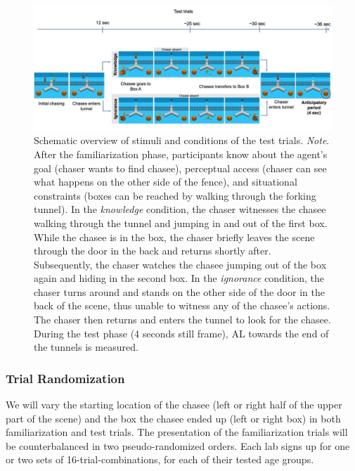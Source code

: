 \documentclass[
  english,
  man,floatsintext]{apa6}
\begin{document}
\begin{figure}

{\centering \includegraphics[width=6.5in]{Figure2} 

}

\caption{Schematic overview of stimuli and conditions of the test trials. \newline{} \textit{Note}. After the familiarization phase, participants know about the agent’s goal (chaser wants to find chasee), perceptual access (chaser can see what happens on the other side of the fence), and situational constraints (boxes can be reached by walking through the forking tunnel). In the \textit{knowledge} condition, the chaser witnesses the chasee walking through the tunnel and jumping in and out of the first box. While the chasee is in the box, the chaser briefly leaves the scene through the door in the back and returns shortly after. Subsequently, the chaser watches the chasee jumping out of the box again and hiding in the second box. In the \textit{ignorance} condition, the chaser turns around and stands on the other side of the door in the back of the scene, thus unable to witness any of the chasee’s actions. The chaser then returns and enters the tunnel to look for the chasee. During the test phase (4 seconds still frame), AL towards the end of the tunnels is measured.}\label{fig:fig2}
\end{figure}

\hypertarget{trial-randomization}{%
\subsubsection{Trial Randomization}\label{trial-randomization}}

We will vary the starting location of the chasee (left or right half of the upper part of the scene) and the box the chasee ended up (left or right box) in both familiarization and test trials. The presentation of the familiarization trials will be counterbalanced in two pseudo-randomized orders. Each lab signs up for one or two sets of 16-trial-combinations, for each of their tested age groups.
\end{document}

